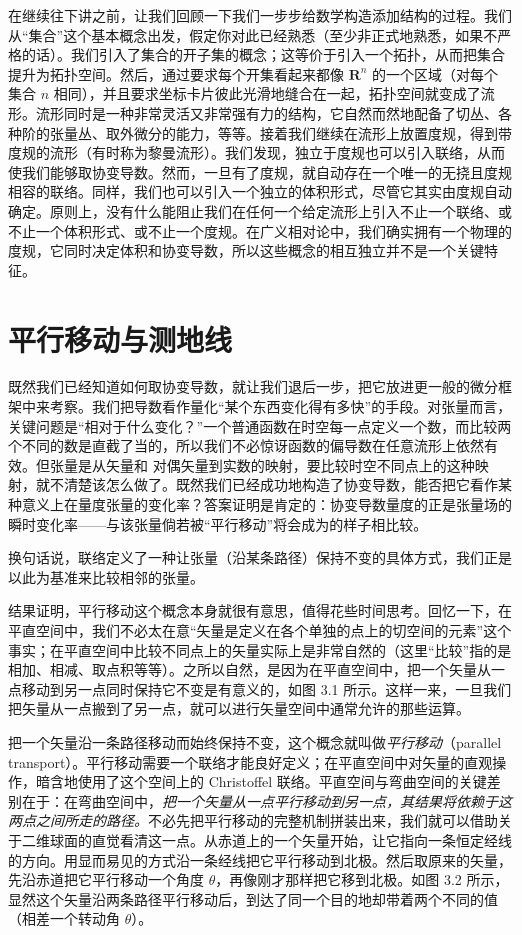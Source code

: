 在继续往下讲之前，让我们回顾一下我们一步步给数学构造添加结构的过程。我们从“集合”这个基本概念出发，假定你对此已经熟悉（至少非正式地熟悉，如果不严格的话）。我们引入了集合的开子集的概念；这等价于引入一个拓扑，从而把集合提升为拓扑空间。然后，通过要求每个开集看起来都像 $\mathbf{R}^n$ 的一个区域（对每个集合 $n$ 相同），并且要求坐标卡片彼此光滑地缝合在一起，拓扑空间就变成了流形。流形同时是一种非常灵活又非常强有力的结构，它自然而然地配备了切丛、各种阶的张量丛、取外微分的能力，等等。接着我们继续在流形上放置度规，得到带度规的流形（有时称为黎曼流形）。我们发现，独立于度规也可以引入联络，从而使我们能够取协变导数。然而，一旦有了度规，就自动存在一个唯一的无挠且度规相容的联络。同样，我们也可以引入一个独立的体积形式，尽管它其实由度规自动确定。原则上，没有什么能阻止我们在任何一个给定流形上引入不止一个联络、或不止一个体积形式、或不止一个度规。在广义相对论中，我们确实拥有一个物理的度规，它同时决定体积和协变导数，所以这些概念的相互独立并不是一个关键特征。

\section{平行移动与测地线}

既然我们已经知道如何取协变导数，就让我们退后一步，把它放进更一般的微分框架中来考察。我们把导数看作量化“某个东西变化得有多快”的手段。对张量而言，关键问题是“相对于什么变化？”一个普通函数在时空每一点定义一个数，而比较两个不同的数是直截了当的，所以我们不必惊讶函数的偏导数在任意流形上依然有效。但张量是从矢量和 对偶矢量到实数的映射，要比较时空不同点上的这种映射，就不清楚该怎么做了。既然我们已经成功地构造了协变导数，能否把它看作某种意义上在量度张量的变化率？答案证明是肯定的：协变导数量度的正是张量场的瞬时变化率——与该张量倘若被“平行移动”将会成为的样子相比较。


换句话说，联络定义了一种让张量（沿某条路径）保持不变的具体方式，我们正是以此为基准来比较相邻的张量。

结果证明，平行移动这个概念本身就很有意思，值得花些时间思考。回忆一下，在平直空间中，我们不必太在意“矢量是定义在各个单独的点上的切空间的元素”这个事实；在平直空间中比较不同点上的矢量实际上是非常自然的（这里“比较”指的是相加、相减、取点积等等）。之所以自然，是因为在平直空间中，把一个矢量从一点移动到另一点同时保持它不变是有意义的，如图 3.1 所示。这样一来，一旦我们把矢量从一点搬到了另一点，就可以进行矢量空间中通常允许的那些运算。

把一个矢量沿一条路径移动而始终保持不变，这个概念就叫做\emph{平行移动}（parallel transport）。平行移动需要一个联络才能良好定义；在平直空间中对矢量的直观操作，暗含地使用了这个空间上的 Christoffel 联络。平直空间与弯曲空间的关键差别在于：在弯曲空间中，\emph{把一个矢量从一点平行移动到另一点，其结果将依赖于这两点之间所走的路径。}不必先把平行移动的完整机制拼装出来，我们就可以借助关于二维球面的直觉看清这一点。从赤道上的一个矢量开始，让它指向一条恒定经线的方向。用显而易见的方式沿一条经线把它平行移动到北极。然后取原来的矢量，先沿赤道把它平行移动一个角度 $\theta$，再像刚才那样把它移到北极。如图 3.2 所示，显然这个矢量沿两条路径平行移动后，到达了同一个目的地却带着两个不同的值（相差一个转动角 $\theta$）。

